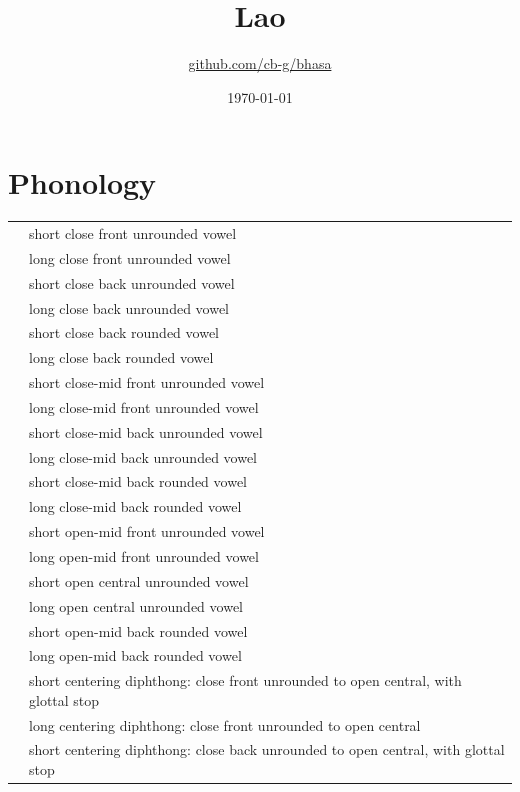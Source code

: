 \documentclass{article}
\title{Lao\\\ipa{[p\super ha:\tone{35}sa:\tone{24}la:w\tone{35}]}}
\author{\href{https://github.com/cb-g/bhasa}{github.com/cb-g/bhasa}}
\date{\today}
\begin{document}
\pagecolor{custom_bg}\color{custom_fg}
\maketitle\thispagestyle{empty}

\newpage\setcounter{page}{1}\section{Phonology}

\begin{xltabular}{\textwidth}{lL}
   & short close front unrounded vowel \\
   & long close front unrounded vowel \\
   & short close back unrounded vowel \\
   & long close back unrounded vowel \\
   & short close back rounded vowel \\
   & long close back rounded vowel \\
   & short close-mid front unrounded vowel \\
   & long close-mid front unrounded vowel \\
   & short close-mid back unrounded vowel \\
   & long close-mid back unrounded vowel \\
   & short close-mid back rounded vowel \\
   & long close-mid back rounded vowel \\
   & short open-mid front unrounded vowel \\
   & long open-mid front unrounded vowel \\
   & short open central unrounded vowel \\
   & long open central unrounded vowel \\
   & short open-mid back rounded vowel \\
   & long open-mid back rounded vowel \\
   & short centering diphthong: close front unrounded to open central, with glottal stop \\
   & long centering diphthong: close front unrounded to open central \\
   & short centering diphthong: close back unrounded to open central, with glottal stop \\

\end{xltabular}
\end{document}
